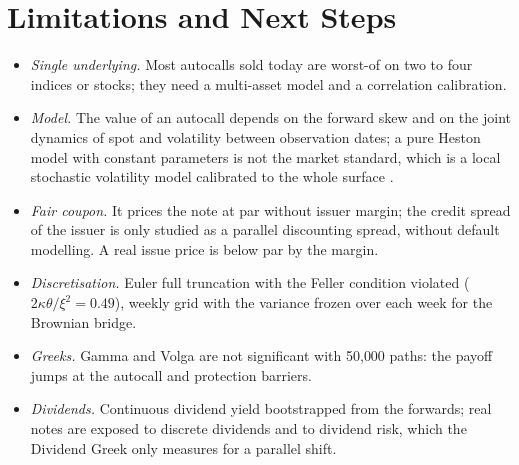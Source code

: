 \documentclass[11pt,a4paper]{article}
\begin{document}
\section{Limitations and Next Steps}\label{sec:limitations}
\begin{itemize}
\item \emph{Single underlying.} Most autocalls sold today are worst-of on two to four indices or stocks; they need
a multi-asset model and a correlation calibration.
\item \emph{Model.} The value of an autocall depends on the forward skew and on the joint dynamics of spot and
volatility between observation dates; a pure Heston model with constant parameters is not the market standard,
which is a local stochastic volatility model calibrated to the whole surface \cite{bergomi2016}.
\item \emph{Fair coupon.} It prices the note at par without issuer margin; the credit spread of the issuer is only
studied as a parallel discounting spread, without default modelling. A real issue price is below par by the margin.
\item \emph{Discretisation.} Euler full truncation with the Feller condition violated ($2\kappa\theta/\xi^2 = 0.49$),
weekly grid with the variance frozen over each week for the Brownian bridge.
\item \emph{Greeks.} Gamma and Volga are not significant with 50{,}000 paths: the payoff jumps at the autocall and
protection barriers.
\item \emph{Dividends.} Continuous dividend yield bootstrapped from the forwards; real notes are exposed to
discrete dividends and to dividend risk, which the Dividend Greek only measures for a parallel shift.
\end{itemize}

\end{document}

